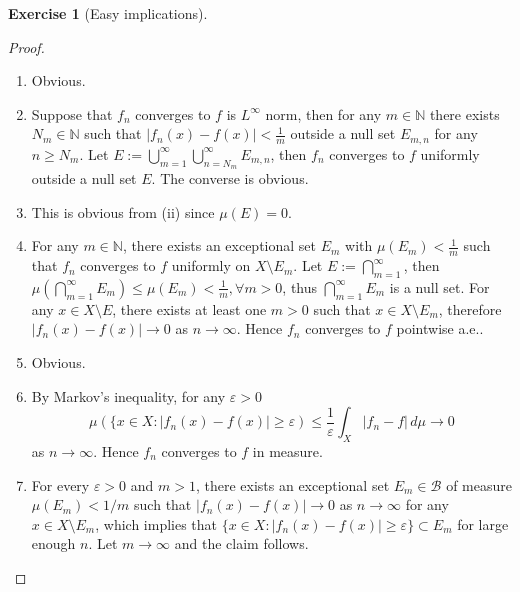 \documentclass[a4paper]{article}
\newtheorem{ex}{Exercise}[subsection]
\begin{document}
\begin{ex}[Easy implications]\end{ex}\begin{proof}\ \begin{enumerate}[label = (\roman*)]
    \item Obvious.
    \item Suppose that $f_n$ converges to $f$ is $L^\infty$ norm, then for any $m \in \mathbb{N}$ there exists $N_m \in \mathbb{N}$
    such that $|f_n(x) - f(x)| < \frac{1}{m}$ outside a null set $E_{m, n}$ for any $n \geq N_m$. Let 
    $E := \bigcup_{m = 1}^\infty \bigcup_{n = N_m}^\infty E_{m, n}$, then $f_n$ converges to $f$ uniformly outside a 
    null set $E$. The converse is obvious.
    \item This is obvious from (ii) since $\mu(E) = 0$.
    \item For any $m \in \mathbb{N}$, there exists an exceptional set $E_m$ with $\mu(E_m) < \frac{1}{m}$ such that
    $f_n$ converges to $f$ uniformly on $X \setminus E_m$. Let $E := \bigcap_{m = 1}^\infty$, then $\mu(\bigcap_{m = 1}^\infty E_m) \leq 
    \mu(E_m) < \frac{1}{m}, \forall m > 0$, thus $\bigcap_{m = 1}^\infty E_m$ is a null set. For any $x \in X \setminus E$,
    there exists at least one $m > 0$ such that $x \in X \setminus E_m$, therefore $|f_n(x) - f(x)| \to 0$ as $n \to \infty$.
    Hence $f_n$ converges to $f$ pointwise a.e..
    \item Obvious.
    \item By Markov's inequality, for any $\varepsilon > 0$ $$
    \mu(\{x \in X : |f_n(x) - f(x)| \geq \varepsilon) \leq \frac{1}{\varepsilon}\int_X |f_n - f| \,d\mu \to 0
    $$as $n \to \infty$. Hence $f_n$ converges to $f$ in measure.
    \item For every $\varepsilon > 0$ and $m > 1$, there exists an exceptional set $E_m \in \mathcal{B}$ of measure $\mu(E_m) < 1/m$
    such that $|f_n(x) - f(x)| \to 0$ as $n \to \infty$ for any $x \in X \setminus E_m$, which implies that 
    $\{x \in X : |f_n(x) - f(x)| \geq \varepsilon\} \subset E_m$ for large enough $n$. Let $m \to \infty$ and the
    claim follows. \qedhere
\end{enumerate}
\end{proof}
\end{document}
